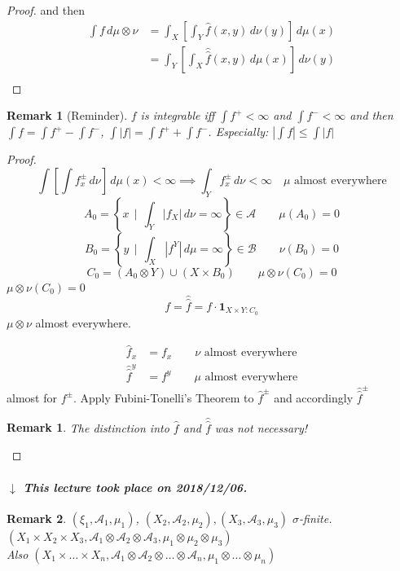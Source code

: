 \documentclass[a4paper]{article}
\newcounter{lecref}[section]
\numberwithin{lecref}{section}
\theoremstyle{break}
\newtheorem{remark}[lecref]{Remark}
\newtheorem*{Remark}{Remark}
\newcommand{\dateref}[1]{%
  \begin{mdframed}[backgroundcolor=gray!10,innerbottommargin=0pt,innertopmargin=0pt]
    \paragraph{\textit{$\downarrow$ This lecture took place on #1.}}%
  \end{mdframed}%
}
\newcommand{\Abs}[1]{\left|#1\right|}
\newcommand{\SetDef}[2]{\left\{#1\,\mid\,#2\right\}}
\begin{document}
\begin{proof}
  and then
  \begin{align*}
    \int f \, d\mu \otimes \nu
      &= \int_X \left[ \int_Y \hat{f}(x, y) \, d\nu(y) \right] \, d\mu(x) \\
      &= \int_Y \left[ \int_X \hat{\hat{f}}(x, y) \, d\mu(x) \right] \, d\nu(y) \\
  \end{align*}
\end{proof}

\begin{remark}[Reminder]
  $f$ is integrable iff $\int f^+ < \infty$ and $\int f^- < \infty$
  and then $\int f = \int f^+ - \int f^-$, $\int \Abs{f} = \int f^+ + \int f^-$.
  Especially: $\Abs{\int f} \leq \int \Abs{f}$
\end{remark}

\begin{proof}
  \[ \int \left[\int f_x^\pm \, d\nu\right] \, d\mu(x) < \infty \implies \int_Y f_x^\pm \, d\nu < \infty \quad \mu \text{ almost everywhere} \]
  \[ A_0 = \SetDef{x}{\int_Y \Abs{f_X} \, d\nu = \infty} \in \mathcal A \qquad \mu(A_0) = 0 \]
  \[ B_0 = \SetDef{y}{\int_X \Abs{f^Y} \, d\mu = \infty} \in \mathcal B \qquad \nu(B_0) = 0 \]
  \[ C_0 = \left(A_0 \otimes Y\right) \cup \left(X \times B_0\right) \qquad \mu \otimes \nu(C_0) = 0 \]
  $\mu \otimes \nu(C_0) = 0$
  \[ f = \hat{\hat{f}} = f \cdot \mathbf{1}_{X \times Y: C_0} \]
  $\mu \otimes \nu$ almost everywhere.

  \begin{align*}
    \hat{f}_x &= f_x  \qquad \nu\text{ almost everywhere} \\
    \hat{\hat{f}}^y &= f^y  \qquad \mu\text{ almost everywhere}
  \end{align*}
  almost for $f^\pm$.
  Apply Fubini-Tonelli's Theorem to $\hat{f}^\pm$ and accordingly $\hat{\hat{f}}^\pm$

  \begin{Remark}
    The distinction into $\hat{f}$ and $\hat{\hat{f}}$ was not necessary!
  \end{Remark}
\end{proof}

\dateref{2018/12/06}

\begin{Remark}
  $(\xi_1, \mathcal A_1, \mu_1)$, $(X_2, \mathcal A_2, \mu_2), (X_3, \mathcal A_3, \mu_3)$ $\sigma$-finite. \\
  $(X_1 \times X_2 \times X_3, \mathcal A_1 \otimes \mathcal A_2 \otimes \mathcal A_3, \mu_1 \otimes \mu_2 \otimes \mu_3)$ \\
  Also $(X_1 \times \dots \times X_n, \mathcal A_1 \otimes \mathcal A_2 \otimes \dots \otimes \mathcal A_n, \mu_1 \otimes \dots \otimes \mu_n)$
\end{Remark}
\end{document}
